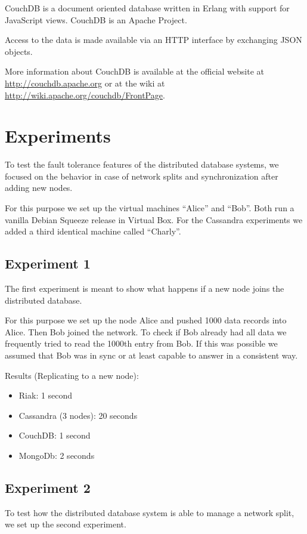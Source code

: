 CouchDB is a document oriented database written in Erlang with
support for JavaScript views. CouchDB is an Apache Project.

Access to the data is made available via an HTTP interface by
exchanging JSON objects.

More information about CouchDB is available at the official website
at \url{http://couchdb.apache.org} or at the wiki at
\url{http://wiki.apache.org/couchdb/FrontPage}.

\section{Experiments}

To test the fault tolerance features of the distributed database
systems, we focused on the behavior in case of network splits and
synchronization after adding new nodes.

For this purpose we set up the virtual machines ``Alice'' and
``Bob''. Both run a vanilla Debian Squeeze release in Virtual Box.
For the Cassandra experiments we added a third identical machine
called ``Charly''.

\subsection{Experiment 1}

The first experiment is meant to show what happens if a new node
joins the distributed database.

For this purpose we set up the node Alice and pushed 1000 data
records into Alice. Then Bob joined the network. To check if Bob
already had all data we frequently tried to read the 1000th entry
from Bob. If this was possible we assumed that Bob was in sync or
at least capable to answer in a consistent way.

Results (Replicating to a new node):

\begin{itemize}
\item
  Riak: 1 second
\item
  Cassandra (3 nodes): 20 seconds
\item
  CouchDB: 1 second
\item
  MongoDb: 2 seconds
\end{itemize}
\subsection{Experiment 2}

To test how the distributed database system is able to manage a
network split, we set up the second experiment.

